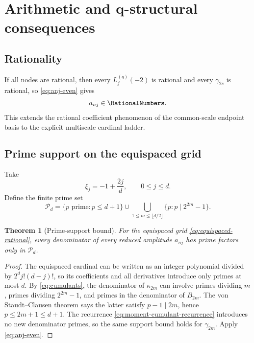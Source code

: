 \documentclass[11pt,oneside]{article}
\newtheorem{theorem}{Theorem}[section]
\theoremstyle{definition}
\theoremstyle{remark}
\begin{document}
\section{Arithmetic and q-structural consequences}

\subsection{Rationality}
If all nodes are rational, then every $L_j^{(q)}(-2)$ is rational and every
$\gamma_{2s}$ is rational, so \eqref{eq:anj-even} gives
\begin{equation}
 a_{nj}\in\RationalNumbers.
 \label{eq:rational-amplitudes}
\end{equation}
This extends the rational coefficient phenomenon of the common-scale
endpoint basis to the explicit multiscale cardinal ladder.

\subsection{Prime support on the equispaced grid}
Take
\begin{equation}
 \xi_j=-1+\frac{2j}{d},
 \qquad 0\le j\le d.
 \label{eq:equispaced-rational}
\end{equation}
Define the finite prime set
\begin{equation}
 \mathcal P_d=
 \{p\text{ prime}:p\le d+1\}
 \cup
 \bigcup_{1\le m\le\lfloor d/2\rfloor}
 \{p:p\mid 2^{2m}-1\}.
 \label{eq:prime-set}
\end{equation}

\begin{theorem}[Prime-support bound]
\label{thm:prime-support}
For the equispaced grid \eqref{eq:equispaced-rational}, every denominator of
every reduced amplitude $a_{nj}$ has prime factors only in
$\mathcal P_d$.
\end{theorem}

\begin{proof}
The equispaced cardinal can be written as an integer polynomial divided by
$2^d j!(d-j)!$, so its coefficients and all derivatives introduce only
primes at most $d$.  By \eqref{eq:cumulants}, the denominator of
$\kappa_{2m}$ can involve primes dividing $m$, primes dividing
$2^{2m}-1$, and primes in the denominator of $B_{2m}$.  The von
Staudt--Clausen theorem says the latter satisfy $p-1\mid2m$, hence
$p\le2m+1\le d+1$.  The recurrence
\eqref{eq:moment-cumulant-recurrence} introduces no new denominator primes,
so the same support bound holds for $\gamma_{2m}$.  Apply
\eqref{eq:anj-even}.
\end{proof}
\end{document}
